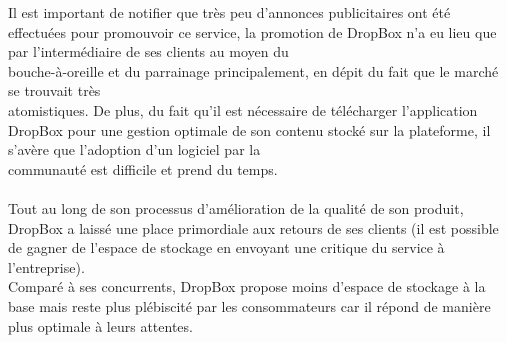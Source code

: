 \documentclass[a4paper, 10pt]{article}
\begin{document}
Il est important de notifier que très peu d'annonces publicitaires ont été effectuées pour promouvoir ce service,
la promotion de DropBox n'a eu lieu que par l'intermédiaire de ses clients au moyen du\\bouche-à-oreille et du parrainage principalement,
en dépit du fait que le marché se trouvait très\\atomistiques.
De plus, du fait qu'il est nécessaire de télécharger l'application DropBox pour une gestion optimale de son contenu stocké sur la plateforme,
il s'avère que l'adoption d'un logiciel par la\\communauté est difficile et prend du temps.\\ \\
Tout au long de son processus d'amélioration de la qualité de son produit, DropBox a laissé une place primordiale aux retours de ses clients
(il est possible de gagner de l'espace de stockage en envoyant une critique du service à l'entreprise).\\
Comparé à ses concurrents, DropBox propose moins d'espace de stockage à la base mais reste plus plébiscité par les consommateurs
car il répond de manière plus optimale à leurs attentes.\\ \\
\end{document}
